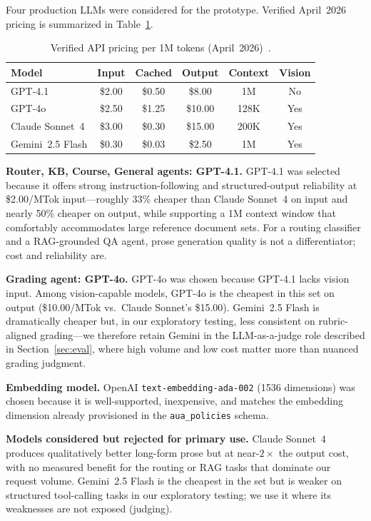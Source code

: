 \documentclass[conference]{IEEEtran}
\begin{document}
Four production LLMs were considered for the prototype. Verified April~2026 pricing is summarized in Table~\ref{tab:pricing}.

\begin{table}[h]
\centering
\caption{Verified API pricing per 1M tokens (April~2026)~\cite{openai_pricing_2026,anthropic_pricing_2026,google_pricing_2026}.}
\label{tab:pricing}
\begin{tabular}{lccccc}
\toprule
Model & Input & Cached & Output & Context & Vision \\
\midrule
GPT-4.1            & \$2.00 & \$0.50  & \$8.00  & 1M   & No  \\
GPT-4o             & \$2.50 & \$1.25  & \$10.00 & 128K & Yes \\
Claude Sonnet~4    & \$3.00 & \$0.30  & \$15.00 & 200K & Yes \\
Gemini~2.5 Flash   & \$0.30 & \$0.03  & \$2.50  & 1M   & Yes \\
\bottomrule
\end{tabular}
\end{table}

\textbf{Router, KB, Course, General agents: GPT-4.1.} GPT-4.1 was selected because it offers strong instruction-following and structured-output reliability at \$2.00/MTok input---roughly 33\% cheaper than Claude Sonnet~4 on input and nearly 50\% cheaper on output, while supporting a 1M context window that comfortably accommodates large reference document sets. For a routing classifier and a RAG-grounded QA agent, prose generation quality is not a differentiator; cost and reliability are.

\textbf{Grading agent: GPT-4o.} GPT-4o was chosen because GPT-4.1 lacks vision input. Among vision-capable models, GPT-4o is the cheapest in this set on output (\$10.00/MTok vs.\ Claude Sonnet's \$15.00). Gemini~2.5 Flash is dramatically cheaper but, in our exploratory testing, less consistent on rubric-aligned grading---we therefore retain Gemini in the LLM-as-a-judge role described in Section~\ref{sec:eval}, where high volume and low cost matter more than nuanced grading judgment.

\textbf{Embedding model.} OpenAI \texttt{text-embedding-ada-002} (1536 dimensions) was chosen because it is well-supported, inexpensive, and matches the embedding dimension already provisioned in the \texttt{aua\_policies} schema.

\textbf{Models considered but rejected for primary use.} Claude Sonnet~4 produces qualitatively better long-form prose but at near-$2\times$ the output cost, with no measured benefit for the routing or RAG tasks that dominate our request volume. Gemini~2.5 Flash is the cheapest in the set but is weaker on structured tool-calling tasks in our exploratory testing; we use it where its weaknesses are not exposed (judging).
\end{document}
